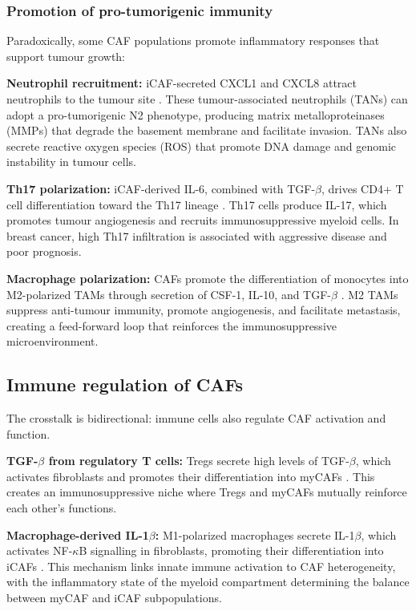 \subsubsection{Promotion of pro-tumorigenic immunity}

Paradoxically, some CAF populations promote inflammatory responses that support tumour growth:

\textbf{Neutrophil recruitment:} iCAF-secreted CXCL1 and CXCL8 attract neutrophils to the tumour site \citep{acharyya2012}. These tumour-associated neutrophils (TANs) can adopt a pro-tumorigenic N2 phenotype, producing matrix metalloproteinases (MMPs) that degrade the basement membrane and facilitate invasion. TANs also secrete reactive oxygen species (ROS) that promote DNA damage and genomic instability in tumour cells.

\textbf{Th17 polarization:} iCAF-derived IL-6, combined with TGF-$\beta$, drives CD4+ T cell differentiation toward the Th17 lineage \citep{chang2014}. Th17 cells produce IL-17, which promotes tumour angiogenesis and recruits immunosuppressive myeloid cells. In breast cancer, high Th17 infiltration is associated with aggressive disease and poor prognosis.

\textbf{Macrophage polarization:} CAFs promote the differentiation of monocytes into M2-polarized TAMs through secretion of CSF-1, IL-10, and TGF-$\beta$ \citep{qian2011}. M2 TAMs suppress anti-tumour immunity, promote angiogenesis, and facilitate metastasis, creating a feed-forward loop that reinforces the immunosuppressive microenvironment.

\subsection{Immune regulation of CAFs}

The crosstalk is bidirectional: immune cells also regulate CAF activation and function.

\textbf{TGF-$\beta$ from regulatory T cells:} Tregs secrete high levels of TGF-$\beta$, which activates fibroblasts and promotes their differentiation into myCAFs \citep{donnelly2015}. This creates an immunosuppressive niche where Tregs and myCAFs mutually reinforce each other's functions.

\textbf{Macrophage-derived IL-1$\beta$:} M1-polarized macrophages secrete IL-1$\beta$, which activates NF-$\kappa$B signalling in fibroblasts, promoting their differentiation into iCAFs \citep{erve2024}. This mechanism links innate immune activation to CAF heterogeneity, with the inflammatory state of the myeloid compartment determining the balance between myCAF and iCAF subpopulations.

